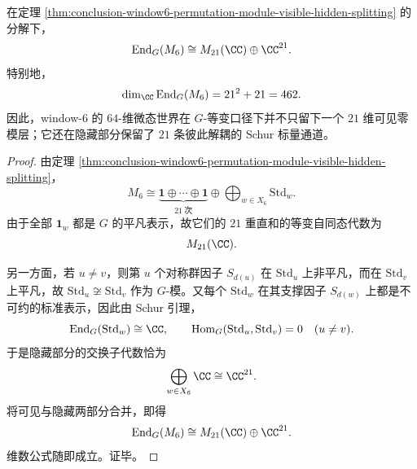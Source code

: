 \begin{theorem}[微态置换模的交换子代数闭式]\label{thm:conclusion-window6-permutation-module-commutant}
在定理 \ref{thm:conclusion-window6-permutation-module-visible-hidden-splitting} 的分解下，
\[
\operatorname{End}_G(M_6)\cong M_{21}(\CC)\oplus \CC^{21}.
\]
特别地，
\[
\dim_{\CC}\operatorname{End}_G(M_6)=21^2+21=462.
\]
因此，window-\(6\) 的 \(64\)-维微态世界在 \(G\)-等变口径下并不只留下一个 \(21\) 维可见零模层；它还在隐藏部分保留了 \(21\) 条彼此解耦的 Schur 标量通道。
\end{theorem}
\begin{proof}
由定理 \ref{thm:conclusion-window6-permutation-module-visible-hidden-splitting}，
\[
M_6
\cong
\underbrace{\mathbf 1\oplus\cdots\oplus \mathbf 1}_{21\ \text{次}}
\oplus
\bigoplus_{w\in X_6}\mathrm{Std}_w.
\]
由于全部 \(\mathbf 1_w\) 都是 \(G\) 的平凡表示，故它们的 \(21\) 重直和的等变自同态代数为
\[
M_{21}(\CC).
\]

另一方面，若 \(u\neq v\)，则第 \(u\) 个对称群因子 \(S_{d(u)}\) 在 \(\mathrm{Std}_u\) 上非平凡，而在 \(\mathrm{Std}_v\) 上平凡，故 \(\mathrm{Std}_u\not\cong \mathrm{Std}_v\) 作为 \(G\)-模。又每个 \(\mathrm{Std}_w\) 在其支撑因子 \(S_{d(w)}\) 上都是不可约的标准表示，因此由 Schur 引理，
\[
\operatorname{End}_G(\mathrm{Std}_w)\cong \CC,
\qquad
\operatorname{Hom}_G(\mathrm{Std}_u,\mathrm{Std}_v)=0
\quad (u\neq v).
\]
于是隐藏部分的交换子代数恰为
\[
\bigoplus_{w\in X_6}\CC\cong \CC^{21}.
\]
将可见与隐藏两部分合并，即得
\[
\operatorname{End}_G(M_6)\cong M_{21}(\CC)\oplus \CC^{21}.
\]
维数公式随即成立。证毕。
\end{proof}

